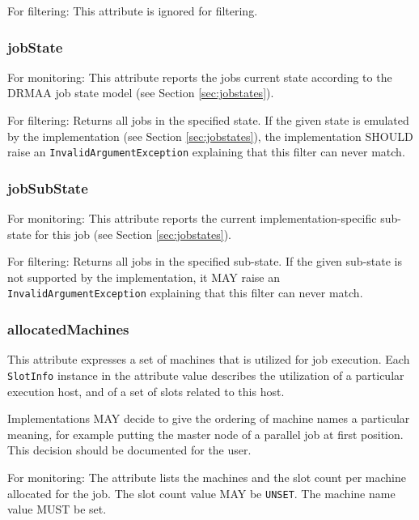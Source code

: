 \documentclass{article}
\newcommand{\h}[1]{\lstinline|#1|}
\newcommand{\rat}[1]{}
\begin{document}
For filtering: This attribute is ignored for filtering.

\subsubsection{jobState}

For monitoring: This attribute reports the jobs current state according to the DRMAA job state model (see Section \ref{sec:jobstates}).

For filtering: Returns all jobs in the specified state. If the given state is emulated by the implementation (see Section \ref{sec:jobstates}), the implementation SHOULD raise an \h{InvalidArgumentException} explaining that this filter can never match.

\subsubsection{jobSubState}
\label{sec:jobSubState}

For monitoring: This attribute reports the current implementation-specific sub-state for this job (see Section \ref{sec:jobstates}).

For filtering: Returns all jobs in the specified sub-state. If the given sub-state is not supported by the implementation, it MAY raise an \h{InvalidArgumentException} explaining that this filter can never match.

\rat{As the jobSubState is an opaque object, any invalid usage may lead to a crash of the library. For this reason, the JUne 29th 2011 conf call decided to use only MAY here, in order to reflect the potentially missing reflection capabilities in the languages.}

\subsubsection{allocatedMachines}

This attribute expresses a set of machines that is utilized for job execution. Each \h{SlotInfo} instance in the attribute value describes the utilization of a particular execution host, and of a set of slots related to this host.

Implementations MAY decide to give the ordering of machine names a particular meaning, for example putting the master node of a parallel job at first position. This decision should be documented for the user. 

For monitoring: The attribute lists the machines and the slot count per machine allocated for the job. The slot count value MAY be \h{UNSET}. The machine name value MUST be set.
\end{document}
